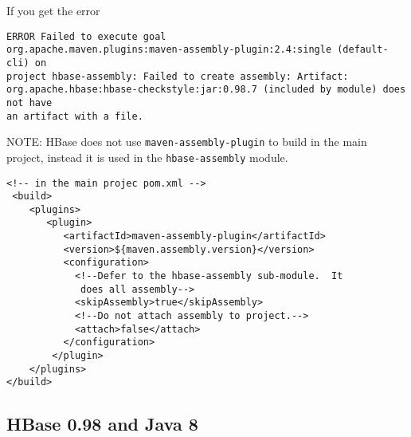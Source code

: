 If you get the error
\begin{verbatim}
ERROR Failed to execute goal
org.apache.maven.plugins:maven-assembly-plugin:2.4:single (default-cli) on
project hbase-assembly: Failed to create assembly: Artifact:
org.apache.hbase:hbase-checkstyle:jar:0.98.7 (included by module) does not have
an artifact with a file.    
\end{verbatim}
NOTE: HBase does not use \verb!maven-assembly-plugin! to build in the main
project, instead it is used in the \verb!hbase-assembly! module.
\begin{verbatim}
<!-- in the main projec pom.xml -->
 <build>
    <plugins>
       <plugin>                                                                                                                                                           
          <artifactId>maven-assembly-plugin</artifactId>                                                                                                                   
          <version>${maven.assembly.version}</version>                                                                                                                     
          <configuration>                                                                                                                                                  
            <!--Defer to the hbase-assembly sub-module.  It                                                                                                                
             does all assembly-->                                                                                                                                          
            <skipAssembly>true</skipAssembly>                                                                                                                              
            <!--Do not attach assembly to project.-->                                                                                                                      
            <attach>false</attach>                                                                                                                                         
          </configuration>                                                                                                                                                 
        </plugin>                             
    </plugins>
</build>    
\end{verbatim}

\subsection{HBase 0.98 and Java 8}
\label{sec:hbase0.98_java8}

